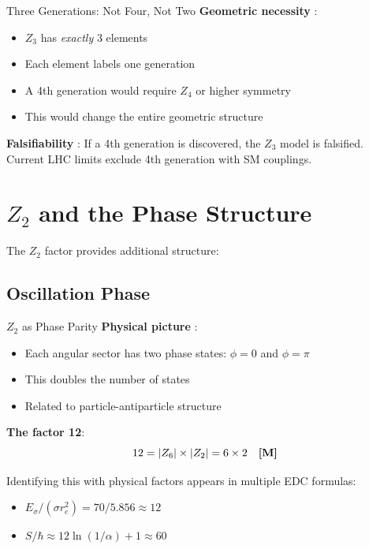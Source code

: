 \begin{statusbox}{{Three Generations: Not Four, Not Two}}
\textbf{Geometric necessity} \tagP{}:
\begin{itemize}[nosep]
\item $Z_3$ has \textit{exactly} 3 elements
\item Each element labels one generation
\item A 4th generation would require $Z_4$ or higher symmetry
\item This would change the entire geometric structure
\end{itemize}

\textbf{Falsifiability} \tagOpen{}:
If a 4th generation is discovered, the $Z_3$ model is falsified.
Current LHC limits exclude 4th generation with SM couplings.
\end{statusbox}

\section{$Z_2$ and the Phase Structure}
\label{sec:z2_structure}

The $Z_2$ factor provides additional structure:

\subsection{Oscillation Phase}

\begin{mechanism}{$Z_2$ as Phase Parity}
\textbf{Physical picture} \tagP{}:
\begin{itemize}[nosep]
\item Each angular sector has two phase states: $\phi = 0$ and $\phi = \pi$
\item This doubles the number of states
\item Related to particle-antiparticle structure
\end{itemize}

\textbf{The factor 12}:
\begin{equation}
12 = |Z_6| \times |Z_2| = 6 \times 2 \quad \textbf{[M]}
\end{equation}

Identifying this with physical factors \tagI{} appears in multiple EDC formulas:
\begin{itemize}[nosep]
\item $E_\sigma / (\sigma r_e^2) = 70 / 5.856 \approx 12$
\item $S/\hbar \approx 12 \ln(1/\alpha) + 1 \approx 60$
\end{itemize}
\end{mechanism}

